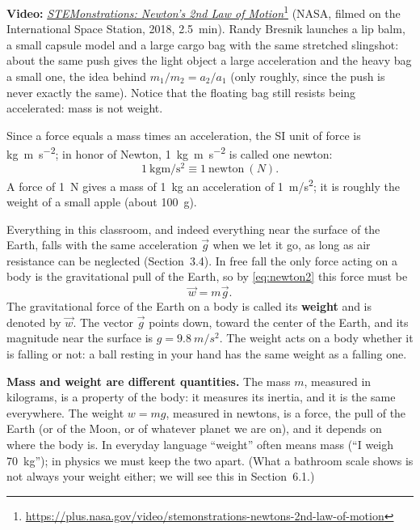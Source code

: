 \documentclass[11pt,a4paper]{article}
\begin{document}
\begin{aside}
\textbf{Video:}
\href{https://plus.nasa.gov/video/stemonstrations-newtons-2nd-law-of-motion}{\emph{STEMonstrations:
Newton's 2nd Law of
Motion}}\footnote{\url{https://plus.nasa.gov/video/stemonstrations-newtons-2nd-law-of-motion}}
(NASA, filmed on the International Space Station, 2018, 2.5~min). Randy Bresnik launches a lip
balm, a small capsule model and a large cargo bag with the same stretched slingshot: about the same
push gives the light object a large acceleration and the heavy bag a small one, the idea behind
$m_1/m_2 = a_2/a_1$ (only roughly, since the push is never exactly the same). Notice that the
floating bag still resists being accelerated: mass is not weight.
\end{aside}

Since a force equals a mass times an acceleration, the SI unit of force is
\unit{\kilogram\metre\per\second\squared}; in honor of Newton,
\qty{1}{\kilogram\metre\per\second\squared} is called one newton:
\begin{equation}\label{eq:newton-unit}
  1\ \unit{\kilogram\metre\per\second\squared} \equiv 1\ \text{newton}\ (\unit{N}) .
\end{equation}
A force of \qty{1}{N} gives a mass of \qty{1}{kg} an acceleration of \qty{1}{m/s^2}; it is roughly
the weight of a small apple (about \qty{100}{g}).

Everything in this classroom, and indeed everything near the surface of the Earth, falls with the
same acceleration $\vec{g}$ when we let it go, as long as air resistance can be neglected
(Section~3.4). In free fall the only force acting on a body is the gravitational pull of the Earth,
so by \eqref{eq:newton2} this force must be
\begin{equation}\label{eq:weight}
  \vec{w} = m\vec{g} .
\end{equation}
The gravitational force of the Earth on a body is called its \textbf{weight} and is denoted by
$\vec{w}$. The vector $\vec{g}$ points down, toward the center of the Earth, and its magnitude near
the surface is $g = \qty{9.8}{m/s^2}$. The weight acts on a body whether it is falling or not: a
ball resting in your hand has the same weight as a falling one.

\textbf{Mass and weight are different quantities.} The mass $m$, measured in kilograms, is a
property of the body: it measures its inertia, and it is the same everywhere. The weight $w = mg$,
measured in newtons, is a force, the pull of the Earth (or of the Moon, or of whatever planet we are
on), and it depends on where the body is. In everyday language ``weight'' often means mass (``I
weigh \qty{70}{kg}''); in physics we must keep the two apart. (What a bathroom scale shows is not
always your weight either; we will see this in Section~6.1.)
\end{document}
